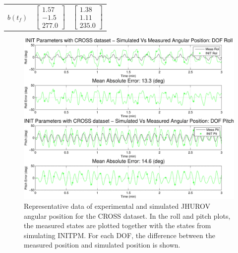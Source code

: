 \begin{table}[htbp]
\begin{center}
\begin{tabular}{c|cc}
\\
$\hat{b}(t_f)$ &
$ \left[\begin{array}{c} 1.57\\ -1.5\\ 277.0 \end{array}\right] $
&
$ \left[\begin{array}{c} 1.38\\ 1.11\\ 235.0 \end{array}\right] $
\\
\end{tabular}
\end{center}
\label{chUV_SO3.tb.UVSO3_ID_params}
\end{table}


\begin{center}
\begin{figure}[htbp]
  \begin{center}
    \includegraphics[width=6in]{./chUV_AID/images/crossINIT_pos}
  \end{center}
  \caption{ Representative data of experimental and simulated
    \ac{JHUROV} angular position for the \ac{CROSS} dataset. In the
    roll and pitch plots, the measured states are plotted together
    with the states from simulating \ac{INITPM}.  For each \ac{DOF},
    the difference between the measured position and simulated
    position is shown. 
}
  \label{chUV_AID.fig.SO3_INIT_pos}
\end{figure}
\end{center}

